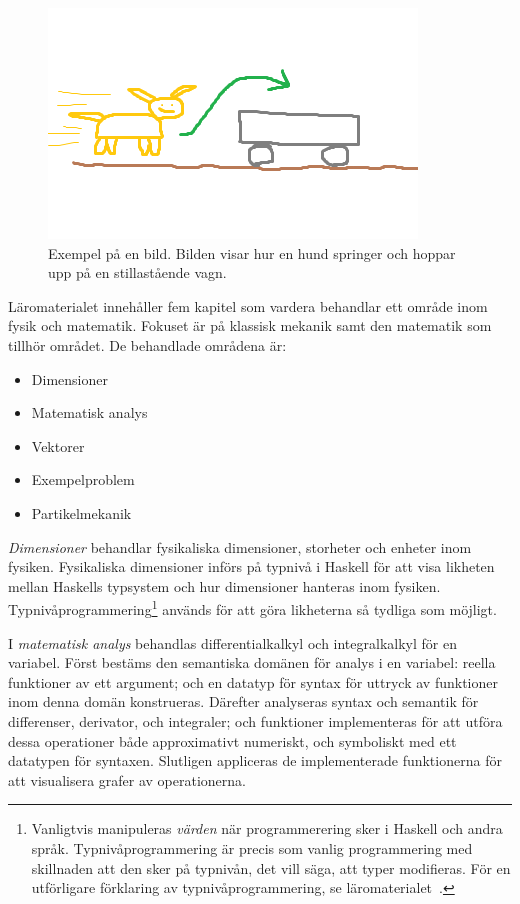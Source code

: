 
\begin{figure}[h]
        \centering
        \includegraphics[width=0.4\linewidth]{figure/smakprov_bild_laromaterial.png}
        \caption{Exempel på en bild. Bilden visar hur en hund springer och hoppar upp på en stillastående vagn.}
        \label{fig:smakprov_bild_laromaterial}
\end{figure}

Läromaterialet innehåller fem kapitel som vardera behandlar ett område inom fysik
och matematik. Fokuset är på klassisk mekanik samt den matematik som tillhör
området. De behandlade områdena är:

\begin{itemize}
  \item Dimensioner
  \item Matematisk analys
  \item Vektorer
  \item Exempelproblem
  \item Partikelmekanik
\end{itemize}

\textit{Dimensioner} behandlar fysikaliska dimensioner, storheter och enheter inom fysiken.
Fysikaliska dimensioner införs på typnivå i Haskell för att visa likheten mellan
Haskells typsystem och hur dimensioner hanteras inom fysiken.
Typnivåprogrammering\footnote{Vanligtvis manipuleras \textit{värden} när
programmerering sker i Haskell och andra språk. Typnivåprogrammering är precis som
vanlig programmering med skillnaden att den sker på typnivån, det vill säga, att
typer modifieras. För en utförligare förklaring av typnivåprogrammering, se läromaterialet~\cite{LYAP}.} används för att göra likheterna så tydliga som möjligt.

I \textit{matematisk analys} behandlas differentialkalkyl och
integralkalkyl för en variabel. Först bestäms den semantiska domänen
för analys i en variabel: reella funktioner av ett argument; och en datatyp för syntax
för uttryck av funktioner inom denna domän konstrueras. Därefter
analyseras syntax och semantik för differenser, derivator, och
integraler; och funktioner implementeras för att utföra dessa
operationer både approximativt numeriskt, och symboliskt med ett
datatypen för syntaxen. Slutligen appliceras de implementerade funktionerna för
att visualisera grafer av operationerna.

